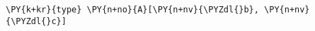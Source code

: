 \begin{Verbatim}[commandchars=\\\{\}]
\PY{k+kr}{type} \PY{n+no}{A}[\PY{n+nv}{\PYZdl{}b}, \PY{n+nv}{\PYZdl{}c}]
\end{Verbatim}
